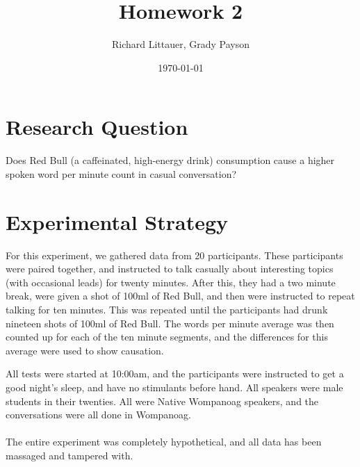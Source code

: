 \documentclass[10pt]{article}
\title{Homework 2}
\author{Richard Littauer, Grady Payson}
\date{\today}                          		%
\begin{document}
\maketitle

\section*{Research Question} 
Does Red Bull (a caffeinated, high-energy drink) consumption cause a higher spoken word per minute count in casual conversation?
\section*{Experimental Strategy}
For this experiment, we gathered data from 20 participants. These participants were paired together, and instructed to talk casually about interesting topics (with occasional leads) for twenty minutes. After this, they had a two minute break, were given a shot of 100ml of Red Bull, and then were instructed to repeat talking for ten minutes. This was repeated until the participants had drunk nineteen shots of 100ml of Red Bull. The words per minute average was then counted up for each of the ten minute segments, and the differences for this average were used to show causation. 

All tests were started at 10:00am, and the participants were instructed to get a good night's sleep, and have no stimulants before hand. All speakers were male students in their twenties. All were Native Wompanoag speakers, and the conversations were all done in Wompanoag.
\\ \ \\
The entire experiment was completely hypothetical, and all data has been massaged and tampered with.
\end{document}

